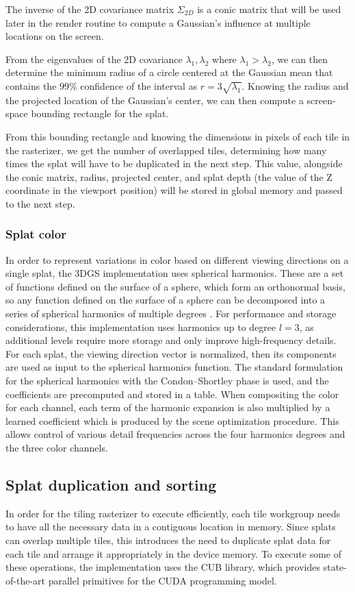 The inverse of the 2D covariance matrix $\Sigma_{2D}$ is a conic matrix that will be used later in the render routine to compute a Gaussian's influence at multiple locations on the screen.

From the eigenvalues of the 2D covariance $\lambda_1, \lambda_2$ where $\lambda_1 > \lambda_2$, we can then determine the minimum radius of a circle centered at the Gaussian mean that contains the 99\% confidence of the interval as $r = 3\sqrt{\lambda_1}$. Knowing the radius and the projected location of the Gaussian's center, we can then compute a screen-space bounding rectangle for the splat. 

From this bounding rectangle and knowing the dimensions in pixels of each tile in the rasterizer, we get the number of overlapped tiles, determining how many times the splat will have to be duplicated in the next step. This value, alongside the conic matrix, radius, projected center, and splat depth (the value of the Z coordinate in the viewport position) will be stored in global memory and passed to the next step.

\subsubsection{Splat color}
In order to represent variations in color based on different viewing directions on a single splat, the 3DGS implementation uses spherical harmonics. These are a set of functions defined on the surface of a sphere, which form an orthonormal basis, so any function defined on the surface of a sphere can be decomposed into a series of spherical harmonics of multiple degrees \cite{maths_for_physiscs}. For performance and storage considerations, this implementation uses harmonics up to degree $l=3$, as additional levels require more storage and only improve high-frequency details. For each splat, the viewing direction vector is normalized, then its components are used as input to the spherical harmonics function. The standard formulation for the spherical harmonics with the Condon–Shortley phase is used, and the coefficients are precomputed and stored in a table. When compositing the color for each channel, each term of the harmonic expansion is also multiplied by a learned coefficient which is produced by the scene optimization procedure. This allows control of various detail frequencies across the four harmonics degrees and the three color channels. 

\subsection{Splat duplication and sorting}
In order for the tiling rasterizer to execute efficiently, each tile workgroup needs to have all the necessary data in a contiguous location in memory. Since splats can overlap multiple tiles, this introduces the need to duplicate splat data for each tile and arrange it appropriately in the device memory. To execute some of these operations, the implementation uses the CUB library, which provides state-of-the-art parallel primitives for the CUDA programming model. 

